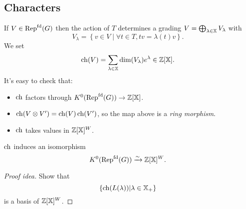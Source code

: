 \subsection{Characters}
If $V\in \operatorname{Rep}^{\text{fd}}(G)$ then the action of $T$ determines a grading $V=\bigoplus_{\lambda\in \mathbb{X}}V_\lambda$ with
\[
V_\lambda = \left\{ v\in V \middle| \forall t\in T,tv = \lambda(t)v \right\} .
\] 
We set
\[
	\operatorname{ch}(V) = \sum_{\lambda\in \mathbb{X}}\dim(V_\lambda)e^{\lambda}\in \mathbb Z[\mathbb{X}].
\] 
It's easy to check that:
\begin{itemize}
	\item $\operatorname{ch}$ factors through $K^{0}(\Repf(G))\to \Z[\XX]$.
	\item $\operatorname{ch}(V\otimes V') = \operatorname{ch}(V)\operatorname{ch}(V')$, so the map above is a \emph{ring morphism}.
	\item $\operatorname{ch}$ takes values in $\mathbb Z[\mathbb{X}]^{W}$.
\end{itemize}
\begin{proposition}
	$\operatorname{ch}$ induces an isomorphism
	\[
		K^{0}(\operatorname{Rep}^{\text{fd}}(G)) \xrightarrow{\sim} \mathbb Z[\mathbb{X}]^{W}.
	\] 
\end{proposition}
\begin{proof}[Proof idea]
	Show that
	\[
	\left\{ \operatorname{ch}(L(\lambda)) \middle| \lambda\in \mathbb{X}_+ \right\} 
	\] 
	is a basis of $\mathbb Z[\mathbb{X}]^{W}$.
\end{proof}



